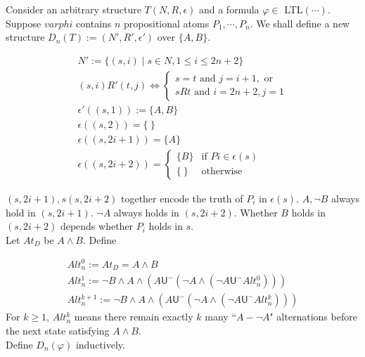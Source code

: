 \documentclass[12pt]{article}
\begin{document}
Consider an arbitrary structure $T(N,R,\epsilon)$ and a formula $\varphi\in$ LTL$(\cdots)$. Suppose $varphi$ contains $n$ propositional atoms $P_1,\cdots, P_n$. 
We shall define a new structure $D_n(T):=(N',R',\epsilon')$ over $\{A,B\}$.

$$\begin{array}{l}
N':=\{(s,i)\mid s\in N, 1\leq i\leq 2n+2\}\\

(s,i)R'(t,j) \Longleftrightarrow\left\{\begin{array}{l}
s=t \mbox{ and } j=i+1, \mbox{ or }\\
sRt \mbox{ and } i=2n+2, j=1
\end{array}\right.\\
\epsilon'((s,1)):=\{A,B\}\\
\epsilon((s,2))=\{\ \}\\
\epsilon((s,2i+1))=\{A\}\\
\epsilon((s,2i+2))=\left\{\begin{array}{ll}
\{B\} & \mbox{if } Pi\in \epsilon(s)\\
\{\ \} & \mbox{otherwise}
\end{array}\right.
\end{array}
$$

$(s,2i+1), s(s,2i+2)$ together encode the truth of $P_i$ in $\epsilon(s)$. 
%
$A, \neg B$ always hold in $(s,2i+1)$. $\neg A$ always holds in $(s,2i+2)$. Whether $B$ holds in $(s,2i+2)$ depends whether $P_i$ holds in $s$. \\


Let $At_D$ be $A\wedge B$. Define 

$$\begin{array}{l}
Alt^0_n:=At_D=A\wedge B\\
Alt^1_n:=\neg B\wedge A\wedge\left(A\textsf{U}^-\left(\neg A\wedge\left(\neg A\textsf{U}^-Alt_n^0\right)\right)\right)\\
Alt^{k+1}_n:=\neg B\wedge A\wedge\left(A\textsf{U}^-\left(\neg A\wedge\left(\neg A\textsf{U}^-Alt_n^k\right)\right)\right)
\end{array}$$
%
For $k\geq 1$, $Alt^k_n$ means there remain exactly $k$ many ``$A-\neg A$" alternations before the next state satisfying $A\wedge B$.\\

Define $D_n(\varphi)$ inductively. 
\end{document}
